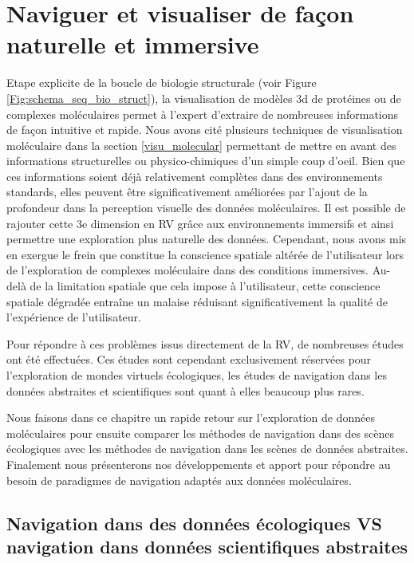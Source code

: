 \chapter[Exploration interactive de données moléculaire en immersion]{Naviguer et visualiser de façon naturelle et immersive}
\label{Sec:CantorDigitalis}
\minitoc
\cleardoublepage

Etape explicite de la boucle de biologie structurale (voir Figure \ref{Fig:schema_seq_bio_struct}), la visualisation de modèles 3d de protéines ou de complexes moléculaires permet à l'expert d'extraire de nombreuses informations de façon intuitive et rapide.
Nous avons cité plusieurs techniques de visualisation moléculaire dans la section \ref{visu_molecular} permettant de mettre en avant des informations structurelles ou physico-chimiques d'un simple coup d'oeil. Bien que ces informations soient déjà relativement complètes dans des environnements standards, elles peuvent être significativement améliorées par l'ajout de la profondeur dans la perception visuelle des données moléculaires. Il est possible de rajouter cette 3e dimension en RV grâce aux environnements immersifs et ainsi permettre une exploration plus naturelle des données.
Cependant, nous avons mis en exergue le frein que constitue la conscience spatiale altérée de l'utilisateur lors de l'exploration de complexes moléculaire dans des conditions immersives. Au-delà de la limitation spatiale que cela impose à l'utilisateur, cette conscience spatiale dégradée entraîne un malaise réduisant significativement la qualité de l'expérience de l'utilisateur. 

Pour répondre à ces problèmes issus directement de la RV, de nombreuses études ont été effectuées. Ces études sont cependant exclusivement réservées pour l'exploration de mondes virtuels écologiques, les études de navigation dans les données abstraites et scientifiques sont quant à elles beaucoup plus rares. 

Nous faisons dans ce chapitre un rapide retour sur l'exploration de données moléculaires pour ensuite comparer les méthodes de navigation dans des scènes écologiques avec les méthodes de navigation dans les scènes de données abstraites. Finalement nous présenterons nos développements et apport pour répondre au besoin de paradigmes de navigation adaptés aux données moléculaires.

\section{Navigation dans des données écologiques VS navigation dans données scientifiques abstraites}

